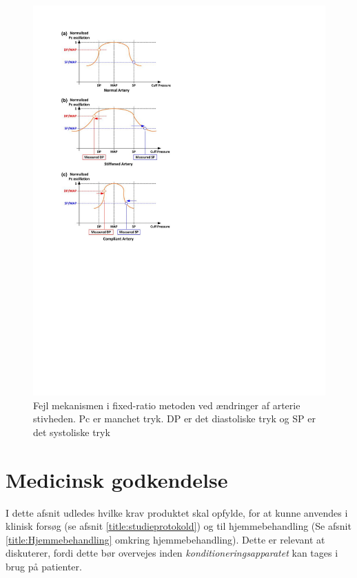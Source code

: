 \begin{minipage}[t]{0.5\textwidth}
	\begin{figure}[H]
		\centering
		\includegraphics[width=1\textwidth]{billeder/ErrorFixed-Ratio.pdf}
		\caption{Fejl mekanismen i fixed-ratio metoden ved ændringer af arterie stivheden. Pc er manchet tryk. DP er det diastoliske tryk og SP er det systoliske tryk}\label{fig:ErrorMechanismOfFixedRatio}
	\end{figure}
\end{minipage}

\section{Medicinsk godkendelse} \label{title:medGodkendelse}
I dette afsnit udledes hvilke krav produktet skal opfylde, for at kunne anvendes i klinisk forsøg (se afsnit \ref{title:studieprotokold}) og til hjemmebehandling (Se afsnit \ref{title:Hjemmebehandling} omkring hjemmebehandling). Dette er relevant at diskuterer, fordi dette bør overvejes inden \textit{konditioneringsapparatet} kan tages i brug på patienter.

